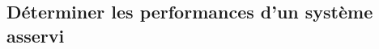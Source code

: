 \subsection{Déterminer les performances d'un système asservi}

\renewcommand{\repExo}{../../ExercicesCompetences/C2_MettreEnOeuvreDemarche/C2_03_PerformancesSLCI}

\renewcommand{\td}{501_Divers}
\graphicspath{{\repStyle/png/}{\repExo/\td/images/}}


